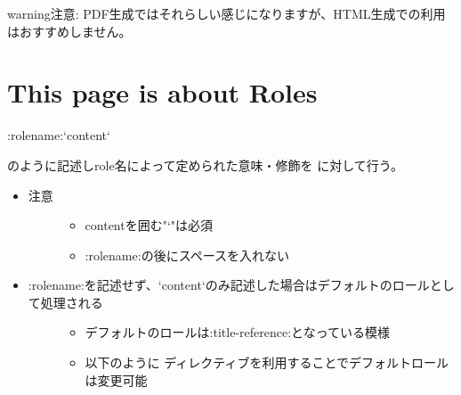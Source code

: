 \documentclass[letterpaper,10pt,dvipdfmx,openany,oneside]{sphinxmanual}
\begin{document}
\begin{sphinxadmonition}{warning}{注意:}
PDF生成ではそれらしい感じになりますが、HTML生成での利用はおすすめしません。
\end{sphinxadmonition}


\chapter{This page is about Roles}
\label{\detokenize{source/1.chapter/roles:this-page-is-about-roles}}\label{\detokenize{source/1.chapter/roles:sample-target}}\label{\detokenize{source/1.chapter/roles::doc}}
%
\begin{sphinxVerbatim}[commandchars=\\\{\}]
:rolename:{}`content{}`
\end{sphinxVerbatim}

のように記述しrole名によって定められた意味・修飾を  に対して行う。
\begin{itemize}
\item {} \begin{description}
\item[{注意}] \leavevmode\begin{itemize}
\item {} 
contentを囲む"{}`"は必須

\item {} 
:rolename:の後にスペースを入れない

\end{itemize}

\end{description}

\item {} \begin{description}
\item[{:rolename:を記述せず、{}`content{}`のみ記述した場合はデフォルトのロールとして処理される}] \leavevmode\begin{itemize}
\item {} 
デフォルトのロールは:title-reference:となっている模様

\item {} 
以下のように  ディレクティブを利用することでデフォルトロールは変更可能

\end{itemize}

\end{description}

\end{itemize}
\end{document}
